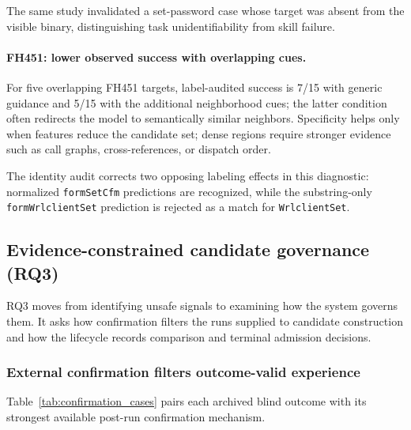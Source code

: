 \documentclass[11pt]{article}
\begin{document}
The same study invalidated a set-password case whose target was absent from the visible
binary, distinguishing task unidentifiability from skill failure.

\paragraph{FH451: lower observed success with overlapping cues.}

For five overlapping FH451 targets, label-audited success is 7/15 with generic guidance
and 5/15 with the additional neighborhood cues; the latter condition often redirects the
model to semantically similar neighbors.
Specificity helps only when features reduce the candidate set; dense regions require
stronger evidence such as call graphs, cross-references, or dispatch order.

The identity audit corrects two opposing labeling effects in this diagnostic: normalized
\texttt{formSetCfm} predictions are recognized, while the substring-only
\texttt{formWrlclientSet} prediction is rejected as a match for \texttt{WrlclientSet}.

\subsection{Evidence-constrained candidate governance (RQ3)}

RQ3 moves from identifying unsafe signals to examining how the system governs them.  It
asks how confirmation filters the runs supplied to candidate construction and how the
lifecycle records comparison and terminal admission decisions.

\subsubsection{External confirmation filters outcome-valid experience}

Table~\ref{tab:confirmation_cases} pairs each archived blind outcome with its strongest
available post-run confirmation mechanism.
\end{document}
